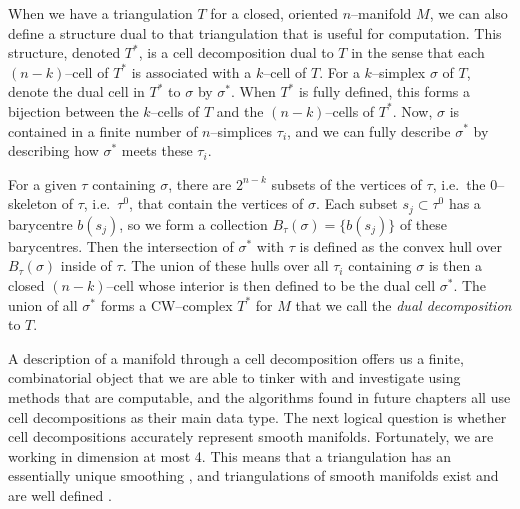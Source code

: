 \begin{defn}
  When we have a triangulation $T$ for a closed, oriented $n$--manifold $M$, we can also define a structure dual to that triangulation that is useful for computation.
  This structure, denoted $T^*$, is a cell decomposition dual to $T$ in the sense that each $(n-k)$--cell of $T^*$ is associated with a $k$--cell of $T$.
  For a $k$--simplex $\sigma$ of $T$, denote the dual cell in $T^*$ to $\sigma$ by $\sigma^*$.
  When $T^*$ is fully defined, this forms a bijection between the $k$--cells of $T$ and the $(n-k)$--cells of $T^*$.
  Now, $\sigma$ is contained in a finite number of $n$--simplices $\tau_i$, and we can fully describe $\sigma^*$ by describing how $\sigma^*$ meets these $\tau_i$.

  For a given $\tau$ containing $\sigma$, there are $2^{n-k}$ subsets of the vertices of $\tau$, i.e.\ the 0--skeleton of $\tau$, i.e.\ $\tau^0$, that contain the vertices of $\sigma$.
  Each subset $s_j\subset\tau^0$ has a barycentre $b(s_j)$, so we form a collection $B_\tau(\sigma)=\{b(s_j)\}$ of these barycentres.
  Then the intersection of $\sigma^*$ with $\tau$ is defined as the convex hull over $B_\tau(\sigma)$ inside of $\tau$.
  The union of these hulls over all $\tau_i$ containing $\sigma$ is then a closed $(n-k)$--cell whose interior is then defined to be the dual cell $\sigma^*$.
  The union of all $\sigma^*$ forms a CW--complex $T^*$ for $M$ that we call the \emph{dual decomposition} to $T$.
\end{defn}

A description of a manifold through a cell decomposition offers us a finite, combinatorial object that we are able to tinker with and investigate using methods that are computable, and the algorithms found in future chapters all use cell decompositions as their main data type.
The next logical question is whether cell decompositions accurately represent smooth manifolds.
Fortunately, we are working in dimension at most 4.
This means that a triangulation has an essentially unique smoothing \cite{HirsMazu}, and triangulations of smooth manifolds exist and are well defined \cite{Whit40}.
